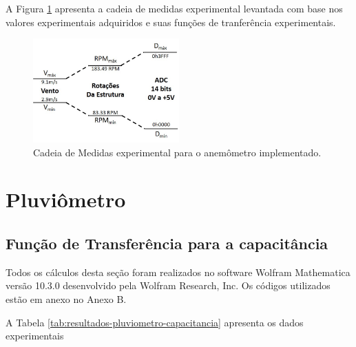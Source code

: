 \documentclass[a4paper]{instrumentacao}
\begin{document}
A Figura \ref{fig:anemometro-cadeia-medidas-experimental} apresenta a cadeia de medidas experimental levantada com base nos valores experimentais adquiridos e suas funções de tranferência experimentais.

\begin{figure}[H]
	\centering \includegraphics[width=0.5\textwidth]{anemometro-cadeia-medidas-experimental.jpg}
	\caption{Cadeia de Medidas experimental para o anemômetro implementado.}
	\label{fig:anemometro-cadeia-medidas-experimental}
\end{figure}


\section{Pluviômetro}
\subsection{Função de Transferência para a capacitância}

Todos os cálculos desta seção foram realizados no software Wolfram Mathematica versão 10.3.0 desenvolvido pela Wolfram Research, Inc. Os códigos utilizados estão em anexo no Anexo B.

A Tabela \ref{tab:resultados-pluviometro-capacitancia} apresenta os dados experimentais
\end{document}
